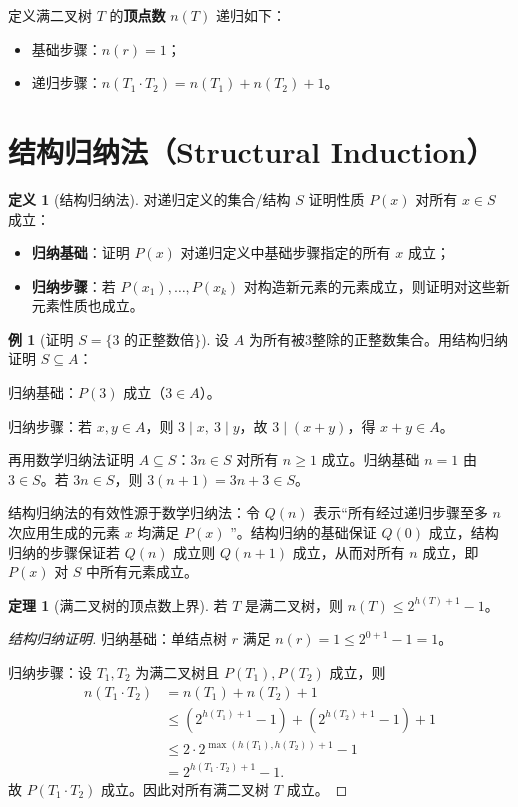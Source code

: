 \documentclass[UTF8,11pt,a4paper]{ctexbook}   %
\theoremstyle{definition}
\newtheorem{definition}{定义}[section]
\newtheorem{theorem}{定理}[section]
\newtheorem{example}{例}[section]
\begin{document}
定义满二叉树 $T$ 的\textbf{顶点数} $n(T)$ 递归如下：
\begin{itemize}
    \item 基础步骤：$n(r) = 1$；
    \item 递归步骤：$n(T_1 \cdot T_2) = n(T_1) + n(T_2) + 1$。
\end{itemize}

\section{结构归纳法（Structural Induction）}

\begin{definition}[结构归纳法]
对递归定义的集合/结构 $S$ 证明性质 $P(x)$ 对所有 $x \in S$ 成立：
\begin{itemize}
    \item \textbf{归纳基础}：证明 $P(x)$ 对递归定义中基础步骤指定的所有 $x$ 成立；
    \item \textbf{归纳步骤}：若 $P(x_1),\dots,P(x_k)$ 对构造新元素的元素成立，则证明对这些新元素性质也成立。
\end{itemize}
\end{definition}

\begin{example}[证明 $S = \{3$ 的正整数倍$\}$]
设 $A$ 为所有被3整除的正整数集合。用结构归纳证明 $S \subseteq A$：

归纳基础：$P(3)$ 成立（$3 \in A$）。

归纳步骤：若 $x,y \in A$，则 $3 \mid x,\ 3 \mid y$，故 $3 \mid (x+y)$，得 $x+y \in A$。

再用数学归纳法证明 $A \subseteq S$：$3n \in S$ 对所有 $n \geq 1$ 成立。归纳基础 $n=1$ 由 $3 \in S$。若 $3n \in S$，则 $3(n+1) = 3n + 3 \in S$。
\end{example}

结构归纳法的有效性源于数学归纳法：令 $Q(n)$ 表示“所有经过递归步骤至多 $n$ 次应用生成的元素 $x$ 均满足 $P(x)$ ”。结构归纳的基础保证 $Q(0)$ 成立，结构归纳的步骤保证若 $Q(n)$ 成立则 $Q(n+1)$ 成立，从而对所有 $n$ 成立，即 $P(x)$ 对 $S$ 中所有元素成立。

\begin{theorem}[满二叉树的顶点数上界]
若 $T$ 是满二叉树，则 $n(T) \leq 2^{h(T)+1} - 1$。
\end{theorem}

\begin{proof}[结构归纳证明]
归纳基础：单结点树 $r$ 满足 $n(r)=1 \leq 2^{0+1}-1 = 1$。

归纳步骤：设 $T_1,T_2$ 为满二叉树且 $P(T_1), P(T_2)$ 成立，则
\begin{align*}
n(T_1 \cdot T_2) &= n(T_1) + n(T_2) + 1 \\
&\leq (2^{h(T_1)+1}-1) + (2^{h(T_2)+1}-1) + 1 \\
&\leq 2 \cdot 2^{\max(h(T_1),h(T_2))+1} - 1 \\
&= 2^{h(T_1 \cdot T_2)+1} - 1.
\end{align*}
故 $P(T_1 \cdot T_2)$ 成立。因此对所有满二叉树 $T$ 成立。
\end{proof}
\end{document}
